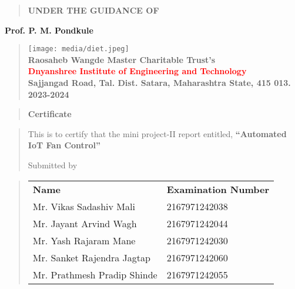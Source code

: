 \documentclass[12pt]{report}
\begin{document}
	\vspace{0.5cm}
	\begin{quote}
		\centering
		\large
		\textbf{UNDER THE GUIDANCE OF}
	\end{quote}
	\textbf{Prof. P. M. Pondkule}
	\vspace{0.5cm}
	\begin{quote}
		\centering
		\texttt{[image: media/diet.jpeg]}\\
		\vspace{0.5cm}
		\bfseries
		\textbf{Raosaheb Wangde Master Charitable Trust's}\\
		\textcolor{red}{Dnyanshree Institute of Engineering and Technology}\\
		Sajjangad Road, Tal. Dist. Satara, Maharashtra State, 415 013.\\ 2023-2024
	\end{quote}
	\vspace{0.5cm}
	
	\newpage
	
	
	
	
	\begin{quote}
		\centering
		\LARGE
		\textbf{Certificate}
	\end{quote}
	
	\begin{quote}
		\normalsize
		\centering
		This is to certify that the mini project-II report entitled, \textbf{``Automated IoT Fan Control''}
		
		Submitted by\\[1ex]
	\end{quote}
	\vspace{0.5cm}
	\begin{quote}
		\centering
		\begin{table}[ht]
			\centering
			\begin{center}
				\begin{tabular}{l l}
					
					\!
					\bfseries \hspace{1.5mm} Name & \bfseries Examination Number \\
					
					Mr. Vikas Sadashiv Mali  & 2167971242038 \\
					Mr. Jayant Arvind Wagh & 2167971242044 \\
					Mr. Yash Rajaram Mane & 2167971242030 \\
					Mr. Sanket Rajendra Jagtap & 2167971242060\\
					Mr. Prathmesh Pradip Shinde & 2167971242055 \\
					
				\end{tabular}
			\end{center}
		\end{table}
	\end{quote}
	
\end{document}
